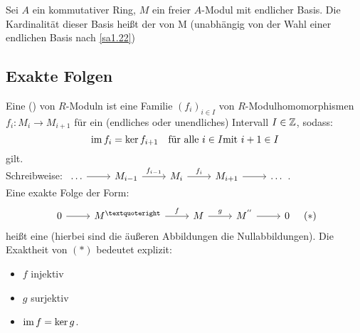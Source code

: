 \begin{df}\label{df1.23}
	Sei $A$ ein kommutativer Ring, $M$ ein freier $A$-Modul mit endlicher Basis. Die Kardinalität dieser Basis heißt der  von M (unabhängig von der Wahl einer endlichen Basis nach \ref{sa1.22})
\end{df}
\newpage
\subsection{Exakte Folgen}
\begin{df}\label{df2.1}
	Eine  () von $R$-Moduln ist eine Familie $(f_i)_{i \in I}$ von $R$-Modulhomomorphismen $f_i: M_i \to M_{i+1} $ für ein (endliches oder unendliches) Intervall $I \in \mathbb{Z} $, sodass: $$ \operatorname{im} f_i = \ker f_{i+1} \quad \text{für alle } i \in I \text{mit} \ i+1 \in I $$ gilt. \\
	Schreibweise: \quad  $\begin{tikzcd}
	\ldots \arrow{r}{}& M_{i-1} \arrow{r}{f_{i-1}}& M_i \arrow{r}{f_i} & M_{i+1} \arrow{r} & \ldots
	\end{tikzcd}$.\\
	Eine exakte Folge der Form: $$\begin{tikzcd}
	0  \arrow{r} & M^{’} \arrow{r}{f} & M \arrow{r}{g} & M^{''} \arrow{r} & 0
	\end{tikzcd}  \quad (\ast) $$
	heißt eine  (hierbei sind die äußeren Abbildungen die Nullabbildungen). Die Exaktheit von $ (\ast)$ bedeutet explizit:
	\begin{itemize}
		\item $f$ injektiv
		\item $g$ surjektiv
		\item $\operatorname{im} f = \ker g $.
	\end{itemize}
\end{df}
